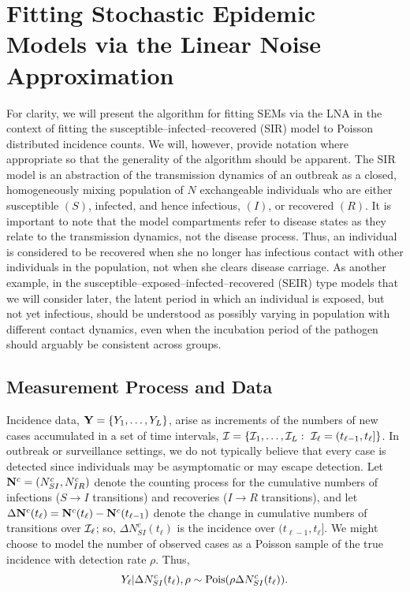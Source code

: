 \section{Fitting Stochastic Epidemic Models via the Linear Noise Approximation}
\label{sec:lna_methods}

For clarity, we will present the algorithm for fitting SEMs via the LNA in the context of fitting the susceptible--infected--recovered (SIR) model to Poisson distributed incidence counts. We will, however, provide notation where appropriate so that the generality of the algorithm should be apparent. The SIR model is an abstraction of the transmission dynamics of an outbreak as a closed, homogeneously mixing population of $ N $ exchangeable individuals who are either susceptible $ (S) $, infected, and hence infectious, $ (I) $, or recovered $ (R) $. It is important to note that the model compartments refer to disease states as they relate to the transmission dynamics, not the disease process. Thus, an individual is considered to be recovered when she no longer has infectious contact with other individuals in the population, not when she clears disease carriage. As another example, in the susceptible--exposed--infected--recovered (SEIR) type models that we will consider later, the latent period in which an individual is exposed, but not yet infectious, should be understood as possibly varying in population with different contact dynamics, even when the incubation period of the pathogen should arguably be consistent across groups.

\subsection{Measurement Process and Data}
\label{subsec:lna_measproc}
Incidence data, $ \mathbf{Y} = \lbrace Y_1,\dots,Y_L\rbrace $,  arise as increments of the numbers of new cases accumulated in a set of time intervals, $ \mathcal{I} = \lbrace\mathcal{I}_1,\dots,\mathcal{I}_L:\ \mathcal{I}_\ell = (t_{\ell-1},t_\ell]\rbrace $. In outbreak or surveillance settings, we do not typically believe that every case is detected since individuals may be asymptomatic or may escape detection. Let $ \mathbf{N}^c = (N^c_{SI}, N^c_{IR}) $ denote the counting process for the cumulative numbers of infections ($ S\rightarrow I $ transitions) and recoveries ($ I\rightarrow R $ transitions), and let $ \Delta \mathbf{N}^c(t_\ell) = \mathbf{N}^c(t_\ell) - \mathbf{N}^c(t_{\ell-1})$ denote the change in cumulative numbers of transitions over $ \mathcal{I}_\ell $; so, $ \Delta N^c_{SI}(t_\ell)$ is the incidence over $ (t_{\ell-1},t_\ell] $. We might choose to model the number of observed cases as a Poisson sample of the true incidence with detection rate $ \rho $. Thus,
\begin{equation}
\label{eqn:incidence_emitprob}
Y_\ell|\Delta N^c_{SI}(t_\ell),\rho \sim \mathrm{Pois}(\rho\Delta N^c_{SI}(t_\ell)).
\end{equation}

